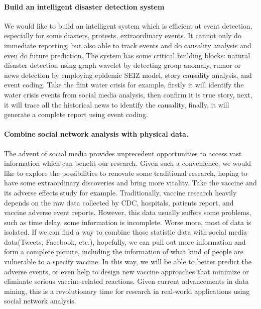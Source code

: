 \paragraph{Build an intelligent disaster detection system}
We would like to build an intelligent system which is efficient at event detection, especially for some diasters, protests, extraordinary events. It cannot only do immediate reporting, but also able to track events and do causality analysis and even do future prediction.
The system has some critical building blocks: natural disaster detection using graph wavelet by detecting group anomaly, rumor or news detection by employing epidemic SEIZ model, story causality analysis, and event coding.
Take the flint water crisis for example, firstly it will identify the water crisis events from social media analysis, then confirm it is true story, next, it will trace all the historical news to identify the causality, finally, it will generate a complete report using event coding.

\paragraph{Combine social network analysis with physical data.}
The advent of social media provides unprecedent opportunities to access vast information which can benefit our research. Given such a convenience, we would like to explore the possibilities to renovate some traditional research, hoping to have some extraordinary discoveries and bring more vitality. Take the vaccine and its adverse effects study for example. Traditionally, vaccine research heavily depends on the raw data collected by CDC, hospitals, patients report, and vaccine adverse event reports. However, this data usually suffers some problems, such as time delay, some information is incomplete. Worse more, most of data is isolated. If we can find a way to combine those statistic data with social media data(Tweets, Facebook, etc.), hopefully, we can pull out more information and form a complete picture, including the information of what kind of people are vulnerable to a specify vaccine. In this way, we will be able to better predict the adverse events, or even help to design new vaccine approaches that minimize or eliminate serious vaccine-related reactions. Given current advancements in data mining, this is a revolutionary time for research in real-world applications using social network analysis.

